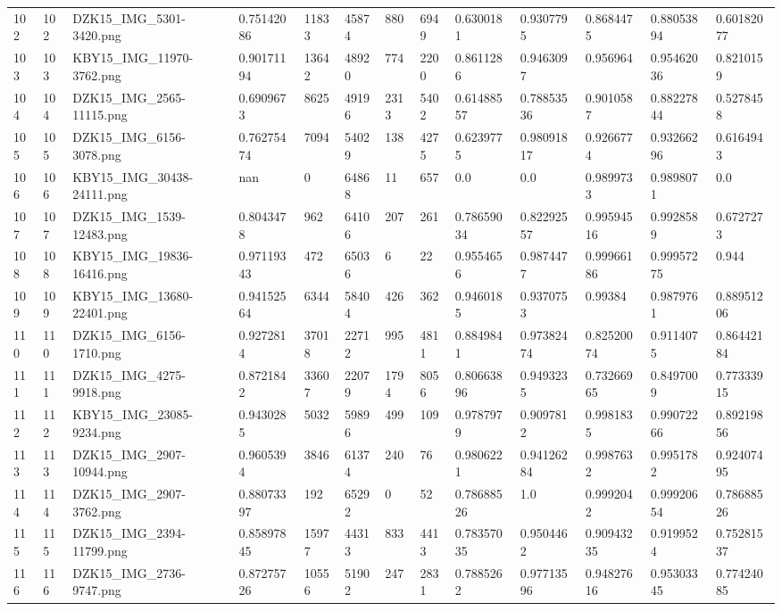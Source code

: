 \documentclass[11pt, a4paper, twoside]{report}
\begin{document}
\begin{longtable}[c]{@{}lllllllllllll@{}}
102 & 102 & DZK15\_IMG\_5301-3420.png & 0.75142086 & 11833 & 45874 & 880 & 6949 & 0.6300181 & 0.9307795 & 0.8684475 & 0.88053894 & 0.60182077 \\
103 & 103 & KBY15\_IMG\_11970-3762.png & 0.90171194 & 13642 & 48920 & 774 & 2200 & 0.8611286 & 0.9463097 & 0.956964 & 0.95462036 & 0.8210159 \\
104 & 104 & DZK15\_IMG\_2565-11115.png & 0.6909673 & 8625 & 49196 & 2313 & 5402 & 0.61488557 & 0.78853536 & 0.9010587 & 0.88227844 & 0.5278458 \\
105 & 105 & DZK15\_IMG\_6156-3078.png & 0.76275474 & 7094 & 54029 & 138 & 4275 & 0.6239775 & 0.98091817 & 0.9266774 & 0.93266296 & 0.6164943 \\
106 & 106 & KBY15\_IMG\_30438-24111.png & nan & 0 & 64868 & 11 & 657 & 0.0 & 0.0 & 0.9899733 & 0.9898071 & 0.0 \\
107 & 107 & DZK15\_IMG\_1539-12483.png & 0.8043478 & 962 & 64106 & 207 & 261 & 0.78659034 & 0.82292557 & 0.99594516 & 0.9928589 & 0.6727273 \\
108 & 108 & KBY15\_IMG\_19836-16416.png & 0.97119343 & 472 & 65036 & 6 & 22 & 0.9554656 & 0.9874477 & 0.99966186 & 0.99957275 & 0.944 \\
109 & 109 & KBY15\_IMG\_13680-22401.png & 0.94152564 & 6344 & 58404 & 426 & 362 & 0.9460185 & 0.9370753 & 0.99384 & 0.9879761 & 0.88951206 \\
110 & 110 & DZK15\_IMG\_6156-1710.png & 0.9272814 & 37018 & 22712 & 995 & 4811 & 0.8849841 & 0.97382474 & 0.82520074 & 0.9114075 & 0.86442184 \\
111 & 111 & DZK15\_IMG\_4275-9918.png & 0.8721842 & 33607 & 22079 & 1794 & 8056 & 0.80663896 & 0.9493235 & 0.73266965 & 0.8497009 & 0.77333915 \\
112 & 112 & KBY15\_IMG\_23085-9234.png & 0.9430285 & 5032 & 59896 & 499 & 109 & 0.9787979 & 0.9097812 & 0.9981835 & 0.99072266 & 0.89219856 \\
113 & 113 & DZK15\_IMG\_2907-10944.png & 0.9605394 & 3846 & 61374 & 240 & 76 & 0.9806221 & 0.94126284 & 0.9987632 & 0.9951782 & 0.92407495 \\
114 & 114 & DZK15\_IMG\_2907-3762.png & 0.88073397 & 192 & 65292 & 0 & 52 & 0.78688526 & 1.0 & 0.9992042 & 0.99920654 & 0.78688526 \\
115 & 115 & DZK15\_IMG\_2394-11799.png & 0.85897845 & 15977 & 44313 & 833 & 4413 & 0.78357035 & 0.9504462 & 0.90943235 & 0.9199524 & 0.75281537 \\
116 & 116 & DZK15\_IMG\_2736-9747.png & 0.87275726 & 10556 & 51902 & 247 & 2831 & 0.7885262 & 0.97713596 & 0.94827616 & 0.95303345 & 0.77424085 \\

\end{longtable}
\end{document}
